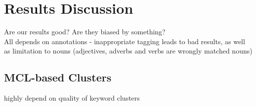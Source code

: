 %
\section{Results Discussion}
\label{sec_discussion}

Are our results good? Are they biased by something? \\

All depends on annotations - inappropriate tagging leads to bad results, as well as limitation to nouns (adjectives, adverbs and verbs are wrongly matched nouns) \\

\subsection{MCL-based Clusters}
highly depend on quality of keyword clusters